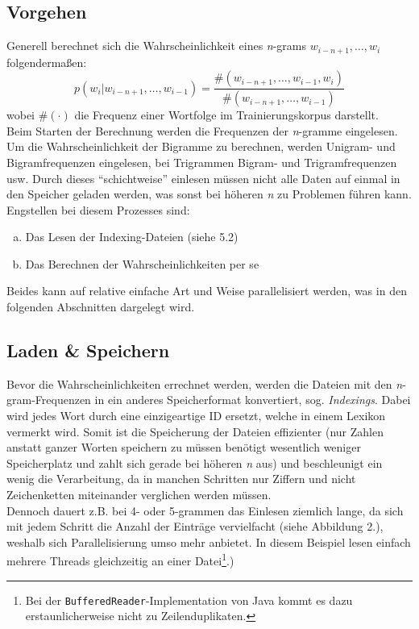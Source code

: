 \documentclass[a4paper,12pt]{scrartcl}
\begin{document}
    \subsection{Vorgehen}

    Generell berechnet sich die Wahrscheinlichkeit eines \emph{n}-grams $w_{i-n+1},\ldots,w_i$ folgendermaßen:
    \[p(w_i|w_{i-n+1},\ldots, w_{i-1}) = \frac{\#(w_{i-n+1},\ldots, w_{i-1}, w_i)}{\#(w_{i-n+1},\ldots, w_{i-1})} \]
    wobei $\#(\cdot)$ die Frequenz einer Wortfolge im Trainierungskorpus darstellt\cite{lm}. \\

    Beim Starten der Berechnung werden die Frequenzen der \emph{n}-gramme eingelesen. Um die Wahrscheinlichkeit der Bigramme zu berechnen, werden Unigram- und Bigramfrequenzen eingelesen, bei Trigrammen Bigram- und Trigramfrequenzen usw. Durch dieses ``schichtweise'' einlesen müssen nicht alle Daten auf einmal in den Speicher geladen werden, was sonst bei höheren \emph{n} zu Problemen führen kann. \\

    Engstellen bei diesem Prozesses sind:
    \begin{enumerate}[a)]
        \item Das Lesen der Indexing-Dateien (siehe 5.2)
        \item Das Berechnen der Wahrscheinlichkeiten per se
    \end{enumerate}
    Beides kann auf relative einfache Art und Weise parallelisiert werden, was in den folgenden Abschnitten dargelegt wird.

    \subsection{Laden \& Speichern}

    Bevor die Wahrscheinlichkeiten errechnet werden, werden die Dateien mit den \emph{n}-gram-Frequenzen in ein anderes Speicherformat konvertiert, sog. \emph{Indexings}. Dabei wird jedes Wort durch eine einzigeartige ID ersetzt, welche in einem Lexikon vermerkt wird. Somit ist die Speicherung der Dateien effizienter (nur Zahlen anstatt ganzer Worten speichern zu müssen benötigt wesentlich weniger Speicherplatz und zahlt sich gerade bei höheren \emph{n} aus) und beschleunigt ein wenig die Verarbeitung, da in manchen Schritten nur Ziffern und nicht Zeichenketten miteinander verglichen werden müssen. \\
    Dennoch dauert z.B. bei 4- oder 5-grammen das Einlesen ziemlich lange, da sich mit jedem Schritt die Anzahl der Einträge vervielfacht (siehe Abbildung 2.), weshalb sich Parallelisierung umso mehr anbietet. In diesem Beispiel lesen einfach mehrere Threads gleichzeitig an einer Datei\footnote{Bei der {\tt BufferedReader}-Implementation von Java kommt es dazu erstaunlicherweise nicht zu Zeilenduplikaten.}.)
\end{document}
